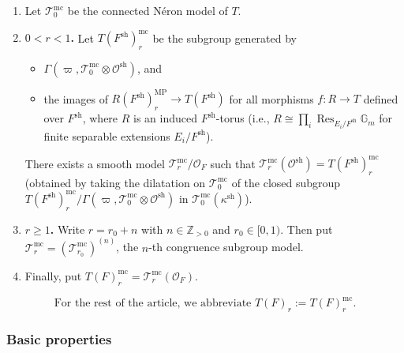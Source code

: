 \documentclass[american]{article}
\numberwithin{equation}{section}
\numberwithin{figure}{section}
\theoremstyle{plain}
\theoremstyle{definition}
\theoremstyle{remark}
\DeclareMathOperator{\sh}{sh}
\begin{document}
\begin{enumerate}[leftmargin=1.8em, label=\textup{(\arabic*)}]
    \item Let $\mathscr{T}^{\mathrm{mc}}_0$ be the connected N\'{e}ron model of $T$.
    
    \item \textbf{$0<r<1$.}
    Let $T(F^{\mathrm{sh}})^{\mathrm{mc}}_r$ be the subgroup generated by 
    \begin{itemize}
        \item[(a)] $\Gamma(\varpi, \mathscr{T}^{\mathrm{mc}}_0 \otimes \mathcal{O}^{\sh})$, and
        \item[(b)] the images of $R(F^{\mathrm{sh}})^{\mathrm{MP}}_r \to T(F^{\mathrm{sh}})$ for all morphisms $f: R \to T$ defined over $F^{\sh}$, 
              where $R$ is an induced $F^{\mathrm{sh}}$-torus (i.e., $R \cong \prod_i \operatorname{Res}_{E_i/F^{\sh}} \mathbb{G}_{m}$ 
              for finite separable extensions $E_i/F^{\mathrm{sh}}$).
    \end{itemize}
    There exists a smooth model $\mathscr{T}^{\mathrm{mc}}_r/\mathcal{O}_F$ such that $\mathscr{T}^{\mathrm{mc}}_r(\mathcal{O}^{\sh}) = T(F^{\sh})^{\mathrm{mc}}_r$ 
    (obtained by taking the dilatation on $\mathscr{T}^{\mathrm{mc}}_0$ of the closed subgroup $T(F^{\sh})^{\mathrm{mc}}_r/\Gamma(\varpi, \mathscr{T}^{\mathrm{mc}}_0 \otimes \mathcal{O}^{\sh})$ 
    in $\mathscr{T}^{\mathrm{mc}}_0(\kappa^{\sh})$).
    
    \item \textbf{$r\ge1$.}
    Write $r=r_0+n$ with $n\in\mathbb{Z}_{>0}$ and $r_0\in[0,1)$. Then put $\mathscr{T}^{\mathrm{mc}}_r = (\mathscr{T}^{\mathrm{mc}}_{r_0})^{(n)}$, 
    the $n$-th congruence subgroup model.
    
    \item Finally, put $T(F)^{\mathrm{mc}}_r = \mathscr{T}^{\mathrm{mc}}_r(\mathcal{O}_F)$.
\end{enumerate}
\[
\boxed{\text{For the rest of the article, we abbreviate } T(F)_r := T(F)_{r}^{\mathrm{mc}}.}
\]

\subsubsection*{Basic properties}
\end{document}
